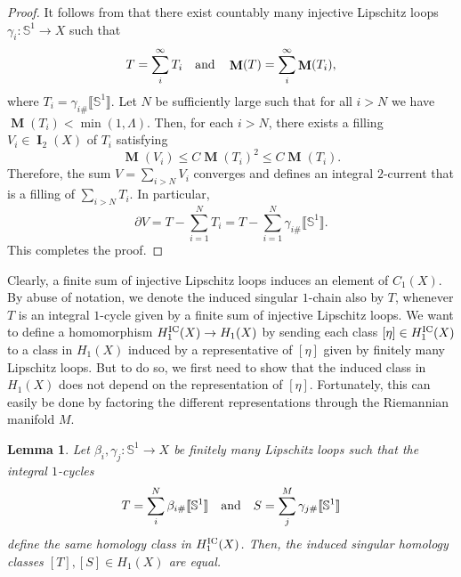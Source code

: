 \documentclass{amsart}
\newtheorem{lemma}[theorem]{Lemma}
\numberwithin{equation}{section}
\DeclareMathOperator{\bI}{\mathbf{I}}
\DeclareMathOperator{\bM}{\mathbf{M}}
\newcommand{\bb}[1]{\llbracket #1\rrbracket}
\begin{document}
        \begin{proof}
            It follows from \cite[Theorem 5.3]{Enrico-Decomposition} that there exist countably many injective Lipschitz loops $\gamma_i \colon \mathbb{S}^1\to X$ such that 
            $$T = \sum_i^\infty  T_i\quad \textup{and} \quad \bM(T) = \sum_i^\infty \bM(T_i),$$
            where $T_i = \gamma_{i\#}\bb{\mathbb{S}^1}$. Let $N$ be sufficiently large such that for all $i>N$ we have $\bM(T_i) < \min({1,\Lambda})$. Then, for each $i>N$, there exists a filling $V_i \in \bI_2(X)$ of $T_i$ satisfying 
            $$\bM(V_i) \leq C\bM(T_i)^2 \leq C \bM(T_i).$$
            Therefore, the sum $V = \sum_{i>N} V_i$ converges and defines an integral $2$-current that is a filling of $\sum_{i>N} T_i$. In particular, 
            $$\partial V = T - \sum_{i=1}^N T_i= T- \sum_{i=1}^N \gamma_{i\#}\bb{\mathbb{S}^1}.$$
            This completes the proof. 
        \end{proof}

        Clearly, a finite sum of injective Lipschitz loops induces an element of $C_1(X)$. By abuse of notation, we denote the induced singular $1$-chain also by $T$, whenever $T$ is an integral $1$-cycle given by a finite sum of injective Lipschitz loops. We want to define a homomorphism $H_1^\textup{IC}(X) \to H_1(X)$ by sending each class $[\eta] \in H_1^\textup{IC}(X)$ to a class in $H_1(X)$ induced by a representative of $[\eta]$ given by finitely many Lipschitz loops. But to do so, we first need to show that the induced class in $H_1(X)$ does not depend on the representation of $[\eta]$. Fortunately, this can easily be done by factoring the different representations through the Riemannian manifold $M$. 

        \begin{lemma}\label{lemma: induced-sing-homology-class-doesnt-depend-on-represent}
            Let $\beta_i,\gamma_j\colon \mathbb{S}^1\to X$ be finitely many Lipschitz loops such that the integral $1$-cycles
            $$T = \sum_i^N \beta_{i\#}\bb{\mathbb{S}^1} \quad \textup{and} \quad S= \sum_j^M \gamma_{j\#}\bb{\mathbb{S}^1}$$
            define the same homology class in $H_1^\textup{IC}(X)$. Then, the induced singular homology classes $[T],[S]\in H_1(X)$ are equal.
        \end{lemma}

\end{document}

